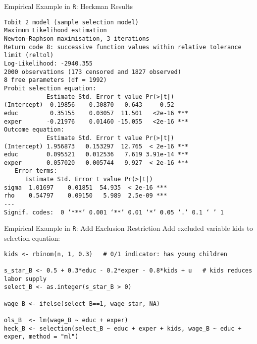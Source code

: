 \documentclass[aspectratio=169,11pt]{beamer}
\begin{document}
\begin{frame}[fragile]{Empirical Example in \texttt{R}: Heckman Results}
\begin{lstlisting}
Tobit 2 model (sample selection model)
Maximum Likelihood estimation
Newton-Raphson maximisation, 3 iterations
Return code 8: successive function values within relative tolerance limit (reltol)
Log-Likelihood: -2940.355 
2000 observations (173 censored and 1827 observed)
8 free parameters (df = 1992)
Probit selection equation:
            Estimate Std. Error t value Pr(>|t|)    
(Intercept)  0.19856    0.30870   0.643     0.52    
educ         0.35155    0.03057  11.501   <2e-16 ***
exper       -0.21976    0.01460 -15.055   <2e-16 ***
Outcome equation:
            Estimate Std. Error t value Pr(>|t|)    
(Intercept) 1.956873   0.153297  12.765  < 2e-16 ***
educ        0.095521   0.012536   7.619 3.91e-14 ***
exper       0.057020   0.005744   9.927  < 2e-16 ***
   Error terms:
      Estimate Std. Error t value Pr(>|t|)    
sigma  1.01697    0.01851  54.935  < 2e-16 ***
rho    0.54797    0.09150   5.989  2.5e-09 ***
---
Signif. codes:  0 ‘***’ 0.001 ‘**’ 0.01 ‘*’ 0.05 ‘.’ 0.1 ‘ ’ 1
\end{lstlisting}
\end{frame}

\begin{frame}[fragile]{Empirical Example in \texttt{R}: Add Exclusion Restriction}
Add excluded variable \alert{kids} to \alert{selection equation}:
\begin{lstlisting}
kids <- rbinom(n, 1, 0.3)   # 0/1 indicator: has young children

s_star_B <- 0.5 + 0.3*educ - 0.2*exper - 0.8*kids + u   # kids reduces labor supply
select_B <- as.integer(s_star_B > 0)

wage_B <- ifelse(select_B==1, wage_star, NA)

ols_B  <- lm(wage_B ~ educ + exper)
heck_B <- selection(select_B ~ educ + exper + kids, wage_B ~ educ + exper, method = "ml")
\end{lstlisting}
\end{frame}
\end{document}
